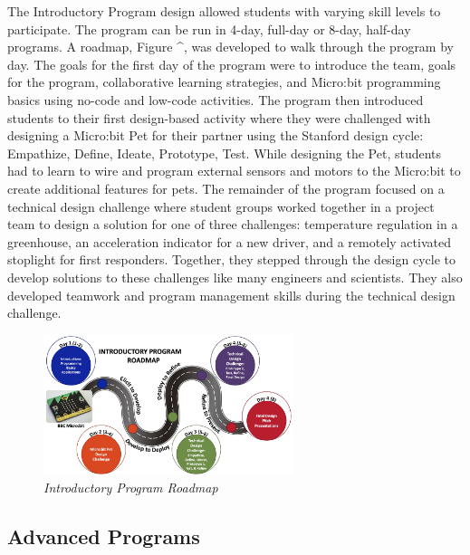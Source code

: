 \documentclass[
]{article}
\begin{document}
The Introductory Program design allowed students with varying skill
levels to participate. The program can be run in 4-day, full-day or
8-day, half-day programs. A roadmap, Figure \^{}, was developed to walk
through the program by day. The goals for the first day of the program
were to introduce the team, goals for the program, collaborative
learning strategies, and Micro:bit programming basics using no-code and
low-code activities. The program then introduced students to their first
design-based activity where they were challenged with designing a
Micro:bit Pet for their partner using the Stanford design cycle:
Empathize, Define, Ideate, Prototype, Test. While designing the Pet,
students had to learn to wire and program external sensors and motors to
the Micro:bit to create additional features for pets. The remainder of
the program focused on a technical design challenge where student groups
worked together in a project team to design a solution for one of three
challenges: temperature regulation in a greenhouse, an acceleration
indicator for a new driver, and a remotely activated stoplight for first
responders. Together, they stepped through the design cycle to develop
solutions to these challenges like many engineers and scientists. They
also developed teamwork and program management skills during the
technical design challenge.

\begin{figure}
\centering
\includegraphics[width=0.65\textwidth,height=\textheight]{Images/GGEE_23_intro_roadmap.jpg}
\caption{\emph{Introductory Program Roadmap}}
\end{figure}

\hypertarget{advanced-programs}{%
\subsection{Advanced Programs}\label{advanced-programs}}
\end{document}
